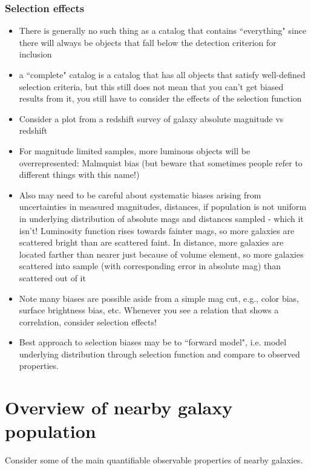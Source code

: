 \documentclass{article}
\begin{document}
\subsubsection{Selection effects}
\begin{itemize}
    \item There is generally no such thing as a catalog that contains
        ``everything" since there will always be objects that fall below the
        detection criterion for inclusion
    \item a ``complete" catalog is a catalog that has all objects that
        satisfy well-defined selection criteria, but this still does not
        mean that you can't get biased results from it, you still have to
        consider the effects of the selection function
    \item Consider a plot from a redshift survey of galaxy absolute
        magnitude vs redshift
    \item For magnitude limited samples, more luminous objects will be
        overrepresented: Malmquist bias (but beware that sometimes people
        refer to different things with this name!)
    \item Also may need to be careful about systematic biases arising from
        uncertainties in measured magnitudes, distances, if population is
        not uniform in underlying distribution of absolute mags and
        distances sampled - which it isn't! Luminosity function rises
        towards fainter mags, so more galaxies are scattered bright than
        are scattered faint. In distance, more galaxies are located farther
        than nearer just because of volume element, so more galaxies
        scattered into sample (with corresponding error in absolute mag)
        than scattered out of it
    \item Note many biases are possible aside from a simple mag cut, e.g.,
        color bias, surface brightness bias, etc.
        Whenever you see a relation that shows a correlation, consider
        selection effects!
    \item Best approach to selection biases may be to ``forward model",
        i.e. model underlying distribution through selection function and
        compare to observed properties.
\end{itemize}

\newpage
\section{Overview of nearby galaxy population}
Consider some of the main quantifiable observable properties of nearby
galaxies.
\end{document}
